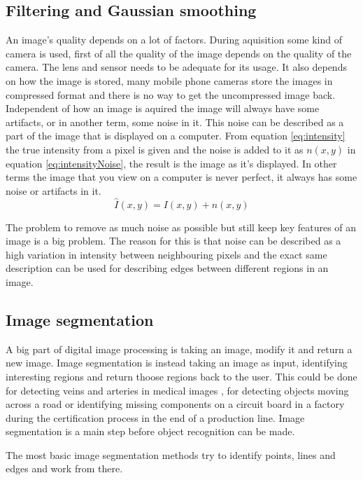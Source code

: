 \subsection{Filtering and Gaussian smoothing}
An image's quality depends on a lot of factors. During aquisition some kind of
camera is used, first of all the quality of the image depends on the quality
of the camera. The lens and sensor needs to be adequate for its usage.
It also depends on how the image is stored, many mobile phone cameras store
the images in compressed format and there is no way to get the uncompressed
image back. Independent of how an image is aquired the image will always have
some artifacts, or in another term, some noise in it. This noise can be described
as a part of the image that is displayed on a computer. From equation \ref{eq:intensity}
 the true intensity from a pixel is given and the noise is added to it as \(n(x,y)\) in
 equation \ref{eq:intensityNoise}, the result is the image as it's displayed. In other
 terms the image that you view on a computer is never perfect, it always has some
 noise or artifacts in it.
\begin{equation}
    \label{eq:intensityNoise}
    \hat{I}(x,y) = I(x,y) + n(x,y)
\end{equation}

The problem to remove as much noise as possible but still keep key features of
an image is a big problem. The reason for this is that noise can be described
as a high variation in intensity between neighbouring pixels and the exact
same description can be used for describing edges between different regions
in an image.


\subsection{Image segmentation}
A big part of digital image processing is taking an image, modify it and
return a new image. Image segmentation is instead taking an image as input,
identifying interesting regions and return thoose regions back to the user.
This could be done for detecting veins and arteries in medical images \cite{olena2010},
for detecting objects moving across a road or identifying missing components on
a circuit board in a factory during the certification process in the end of a production line.
Image segmentation is a main step before object recognition can be made.

The most basic image segmentation methods try to identify points, lines and edges
and work from there.

